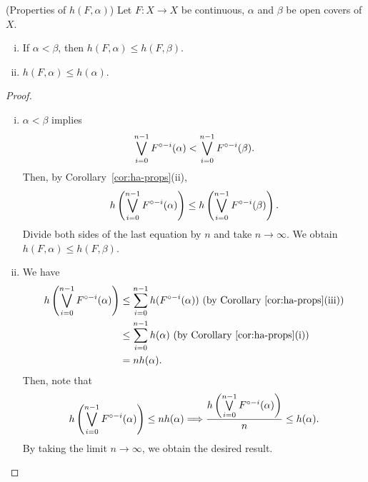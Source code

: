 \documentclass[12pt,twoside,draft]{book}
\begin{document}
\begin{proposition}
  (Properties of $h(F, \alpha)$)
  Let $F: X \to X$ be continuous, $\alpha$ and $\beta$ be open covers of $X$.
  \begin{enumerate}[(i)]
    \item If $\alpha < \beta$, then $h(F, \alpha) \leq h(F, \beta)$.
    \item $h(F, \alpha) \leq h(\alpha)$.
  \end{enumerate}
  \label{hfa-props}
  \begin{proof}
   \begin{enumerate}[(i)]
    \item 
      $\alpha < \beta$ implies
      \begin{equation*}
        \bigvee\limits_{i=0}^{n-1} F^{\circ -i}(\alpha)
        <
        \bigvee\limits_{i=0}^{n-1} F^{\circ -i}(\beta).
      \end{equation*}
      Then, by Corollary~\ref{cor:ha-props}(ii),
      \begin{equation*}
        h\left (  \bigvee\limits_{i=0}^{n-1} F^{\circ -i}(\alpha)  \right )
        \leq
        h\left (  \bigvee\limits_{i=0}^{n-1} F^{\circ -i}(\beta)  \right ).
      \end{equation*}
      Divide both sides of the last equation by $n$ and take $n \to \infty$.
      We obtain $h(F, \alpha) \leq h(F, \beta)$.
    \item 
      We have
      \begin{align*}
        h\left (  \bigvee\limits_{i=0}^{n-1} F^{\circ -i}(\alpha)  \right )
        &\leq \sum\limits_{i=0}^{n-1} h(F^{\circ -i}(\alpha)) 
        \mbox{ (by Corollary~\ref{cor:ha-props}(iii))} \\
        &\leq \sum\limits_{i=0}^{n-1} h(\alpha) 
        \mbox{ (by Corollary~\ref{cor:ha-props}(i))}  \\
        &= n h(\alpha).
      \end{align*}
      Then, note that
      \begin{equation*}
        h\left (  \bigvee\limits_{i=0}^{n-1} F^{\circ -i}(\alpha)  \right )
        \leq n h(\alpha)
        \Longrightarrow 
        \frac{ h\left (  \bigvee\limits_{i=0}^{n-1} F^{\circ -i}(\alpha)  \right ) }{n}
        \leq h(\alpha).
      \end{equation*}
      By taking the limit $n \to \infty$, we obtain the desired result.
  \end{enumerate}
  \end{proof}
\end{proposition}
\end{document}
